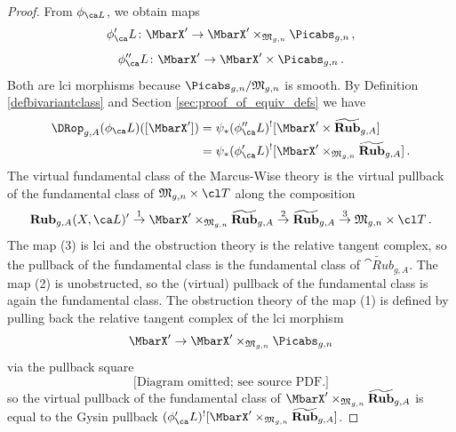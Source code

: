 \begin{proof}
From $\phi_{\ca L}$, we obtain maps
$$\phi'_\ca L\colon  \MbarX' \to \MbarX'\times_{\frak M_{g,n}}\Picabs_{g,n}\, ,$$ $$\phi''_\ca L\colon  \MbarX' \to \MbarX'\times \Picabs_{g,n}\, . $$
Both are lci morphisms because $\Picabs_{g,n}/\frak M_{g,n}$ is smooth. By
Definition \ref{defbivariantclass} and Section \ref{sec:proof_of_equiv_defs} we have
\begin{align*}
    \DRop_{g,A}(\phi_\ca L)([\MbarX']) &=  \psi_*(\phi''_\ca L)^![\MbarX' \times \widetilde{\cat{Rub}}_{g,A}]\\
    &= \psi_*(\phi'_\ca L)^![\MbarX' \times_{\frak M_{g,n}} \widetilde{\cat{Rub}}_{g,A}]\, .
\end{align*}
The virtual fundamental class of the Marcus-Wise theory is the virtual pullback of the fundamental class of $\frak M_{g,n} \times \cl T$ along the composition
\begin{equation}
\cat{Rub}_{g,A}(X, \ca L)'  \stackrel{1}{\to} \MbarX' \times_{\frak M_{g,n}} \widetilde{\cat{Rub}}_{g,A}   \stackrel{2}{\to} \widetilde{\cat{Rub}}_{g,A}   \stackrel{3}{\to} \frak M_{g,n} \times \cl T\, .
\end{equation}
The map (3) is lci and the obstruction theory is the relative tangent complex, so the pullback of the fundamental class is the fundamental class of $\widetilde{\cat{Rub}}_{g,A}$. The map (2) is unobstructed, so the (virtual) pullback of the fundamental class is again the fundamental class. The obstruction theory of the map (1) is defined by pulling back the relative tangent complex of the lci morphism $$\MbarX' \to \MbarX' \times_{\frak M_{g,n}}\Picabs_{g, n}$$ via the pullback square
\begin{equation}
\text{[Diagram omitted; see source PDF.]}
\end{equation}
so the virtual pullback of the fundamental class of $\MbarX' \times_{\frak M_{g,n}} \widetilde{\cat{Rub}}_{g,A}$ is  equal to the Gysin pullback $(\phi'_\ca L)^![\MbarX' \times_{\frak M_{g,n}} \widetilde{\cat{Rub}}_{g,A}]$.

\end{proof}
